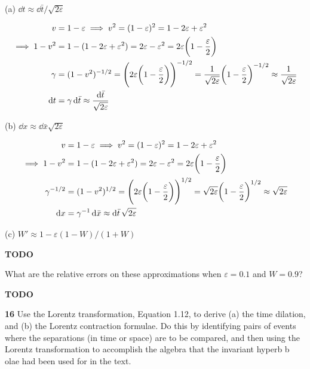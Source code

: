 \documentclass[gr-notes.tex]{subfiles}
\begin{document}
(a) $\dd{t} \approx \dd{\bar{t}} / \sqrt{2 \varepsilon}$

\begin{align*}
  v &=
  1 - \varepsilon \implies
  v^2 = (1 - \varepsilon)^2 =
  1 - 2 \varepsilon + \varepsilon^2
  \\ \implies
  1 - v^2 &=
  1 - (1 - 2 \varepsilon + \varepsilon^2) =
  2 \varepsilon - \varepsilon^2 =
  2 \varepsilon \qty(1 - \frac{\varepsilon}{2})
  \\
  \gamma &=
  (1 - v^2)^{-1/2} =
  \qty(2 \varepsilon \qty(1 - \frac{\varepsilon}{2}))^{-1/2} =
  \frac{1}{\sqrt{2 \varepsilon}} \qty(1 - \frac{\varepsilon}{2})^{-1/2} \approx
  \frac{1}{\sqrt{2 \varepsilon}}
  \\
  \dd{t} &=
  \gamma \dd{\bar{t}} \approx
  \frac{\dd{\bar{t}}}{\sqrt{2 \varepsilon}}
\end{align*}

(b) $\dd{x} \approx \dd{\bar{x}} \sqrt{2 \varepsilon}$

\begin{align*}
  v &=
  1 - \varepsilon \implies
  v^2 = (1 - \varepsilon)^2 =
  1 - 2 \varepsilon + \varepsilon^2
  \\ \implies
  1 - v^2 &=
  1 - (1 - 2 \varepsilon + \varepsilon^2) =
  2 \varepsilon - \varepsilon^2 =
  2 \varepsilon \qty(1 - \frac{\varepsilon}{2})
  \\
  \gamma^{-1/2} &=
  (1 - v^2)^{1/2} =
  \qty(2 \varepsilon \qty(1 - \frac{\varepsilon}{2}))^{1/2} =
  \sqrt{2 \varepsilon} \qty(1 - \frac{\varepsilon}{2})^{1/2} \approx
  \sqrt{2 \varepsilon}
  \\
  \dd{x} &=
  \gamma^{-1} \dd{\bar{x}} \approx
  \dd{\bar{t}} \sqrt{2 \varepsilon}
\end{align*}

(c) $W' \approx 1 - \varepsilon (1 - W) / (1 + W)$

\textbf{TODO}

What are the relative errors on these approximations when $\varepsilon = 0.1$ and $W = 0.9$?

\textbf{TODO}


\textbf{16}
Use the Lorentz transformation, Equation 1.12, to derive (a) the time dilation, and (b) the Lorentz contraction formulae. Do this by identifying pairs of events where the separations (in time or space) are to be compared, and then using the Lorentz transformation to accomplish the algebra that the invariant hyperb b olae had been used for in the text.
\end{document}
